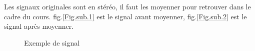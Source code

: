 
Les signaux originales sont en stéréo, il faut les moyenner pour retrouver dans le cadre du cours.
fig.\ref{Fig.sub.1} est le signal avant moyenner, fig.\ref{Fig.sub.2} est le signal après moyenner.
\begin{figure}[htb]
\caption{Exemple de signal}
\label{Fig.main}
\end{figure}
